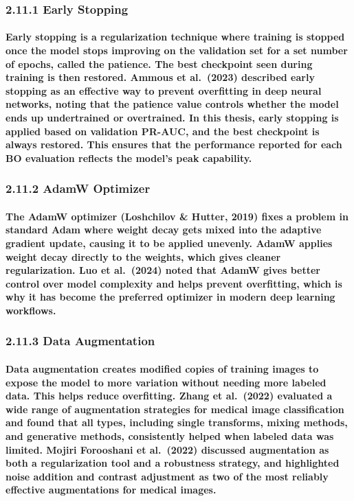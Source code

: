\subsubsection{2.11.1 Early Stopping}\label{early-stopping}

\paragraph{Early stopping is a regularization technique where training is stopped once the model stops improving on the validation set for a set number of epochs, called the patience. The best checkpoint seen during training is then restored. Ammous et al. (2023) described early stopping as an effective way to prevent overfitting in deep neural networks, noting that the patience value controls whether the model ends up undertrained or overtrained. In this thesis, early stopping is applied based on validation PR-AUC, and the best checkpoint is always restored. This ensures that the performance reported for each BO evaluation reflects the model’s peak capability.}

\subsubsection{2.11.2 AdamW Optimizer}\label{adamw-optimizer}

\paragraph{The AdamW optimizer (Loshchilov \& Hutter, 2019) fixes a problem in standard Adam where weight decay gets mixed into the adaptive gradient update, causing it to be applied unevenly. AdamW applies weight decay directly to the weights, which gives cleaner regularization. Luo et al. (2024) noted that AdamW gives better control over model complexity and helps prevent overfitting, which is why it has become the preferred optimizer in modern deep learning workflows.}

\subsubsection{2.11.3 Data Augmentation}\label{data-augmentation}

\paragraph{Data augmentation creates modified copies of training images to expose the model to more variation without needing more labeled data. This helps reduce overfitting. Zhang et al. (2022) evaluated a wide range of augmentation strategies for medical image classification and found that all types, including single transforms, mixing methods, and generative methods, consistently helped when labeled data was limited. Mojiri Forooshani et al. (2022) discussed augmentation as both a regularization tool and a robustness strategy, and highlighted noise addition and contrast adjustment as two of the most reliably effective augmentations for medical images.}

